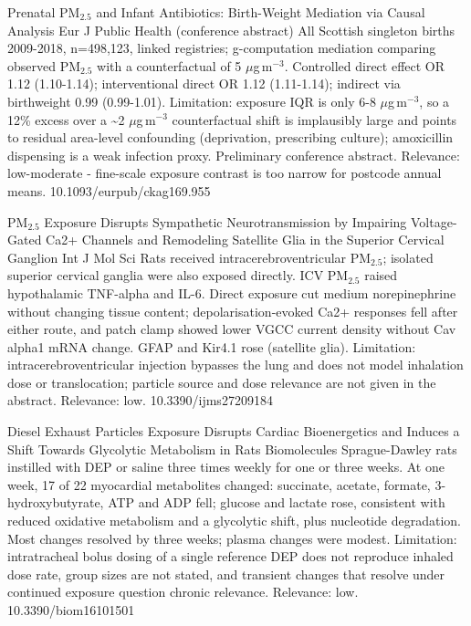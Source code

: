 \documentclass[10pt]{article}
\begin{document}
\par{}\baselineskip{}\baselineskip
{}

{Prenatal PM$_{2.5}$ and Infant Antibiotics: Birth-Weight Mediation via Causal Analysis}
{Eur J Public Health (conference abstract)}
{All Scottish singleton births 2009-2018, n=498,123, linked registries; g-computation mediation comparing observed PM$_{2.5}$ with a counterfactual of 5 $\mu$g\,m$^{-3}$. Controlled direct effect OR 1.12 (1.10-1.14); interventional direct OR 1.12 (1.11-1.14); indirect via birthweight 0.99 (0.99-1.01). Limitation: exposure IQR is only 6-8 $\mu$g\,m$^{-3}$, so a 12\% excess over a \textasciitilde{}2 $\mu$g\,m$^{-3}$ counterfactual shift is implausibly large and points to residual area-level confounding (deprivation, prescribing culture); amoxicillin dispensing is a weak infection proxy. Preliminary conference abstract. Relevance: low-moderate - fine-scale exposure contrast is too narrow for postcode annual means.}
{10.1093/eurpub/ckag169.955}

\par{}\baselineskip{}\baselineskip
{}

{PM$_{2.5}$ Exposure Disrupts Sympathetic Neurotransmission by Impairing Voltage-Gated Ca2+ Channels and Remodeling Satellite Glia in the Superior Cervical Ganglion}
{Int J Mol Sci}
{Rats received intracerebroventricular PM$_{2.5}$; isolated superior cervical ganglia were also exposed directly. ICV PM$_{2.5}$ raised hypothalamic TNF-alpha and IL-6. Direct exposure cut medium norepinephrine without changing tissue content; depolarisation-evoked Ca2+ responses fell after either route, and patch clamp showed lower VGCC current density without Cav alpha1 mRNA change. GFAP and Kir4.1 rose (satellite glia). Limitation: intracerebroventricular injection bypasses the lung and does not model inhalation dose or translocation; particle source and dose relevance are not given in the abstract. Relevance: low.}
{10.3390/ijms27209184}

{Diesel Exhaust Particles Exposure Disrupts Cardiac Bioenergetics and Induces a Shift Towards Glycolytic Metabolism in Rats}
{Biomolecules}
{Sprague-Dawley rats instilled with DEP or saline three times weekly for one or three weeks. At one week, 17 of 22 myocardial metabolites changed: succinate, acetate, formate, 3-hydroxybutyrate, ATP and ADP fell; glucose and lactate rose, consistent with reduced oxidative metabolism and a glycolytic shift, plus nucleotide degradation. Most changes resolved by three weeks; plasma changes were modest. Limitation: intratracheal bolus dosing of a single reference DEP does not reproduce inhaled dose rate, group sizes are not stated, and transient changes that resolve under continued exposure question chronic relevance. Relevance: low.}
{10.3390/biom16101501}
\end{document}
